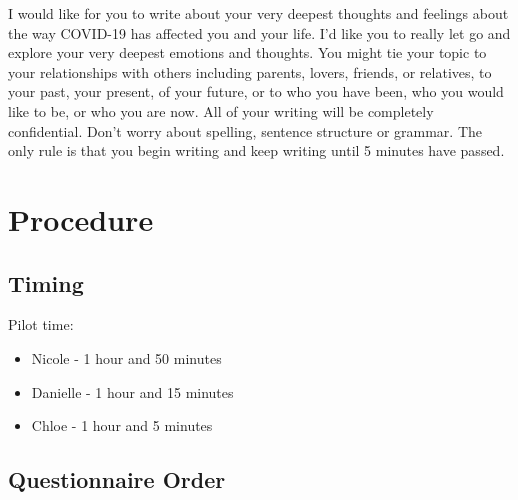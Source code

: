 \documentclass[]{book}
\providecommand{\tightlist}{%
  \setlength{\itemsep}{0pt}\setlength{\parskip}{0pt}}
\begin{document}
I would like for you to write about your very deepest thoughts and feelings about the way COVID-19 has affected you and your life. I'd like you to really let go and explore your very deepest emotions and thoughts. You might tie your topic to your relationships with others including parents, lovers, friends, or relatives, to your past, your present, of your future, or to who you have been, who you would like to be, or who you are now. All of your writing will be completely confidential. Don't worry about spelling, sentence structure or grammar. The only rule is that you begin writing and keep writing until 5 minutes have passed.

\hypertarget{procedure}{%
\section{Procedure}\label{procedure}}

\hypertarget{timing}{%
\subsection{Timing}\label{timing}}

Pilot time:

\begin{itemize}
\tightlist
\item
  Nicole - 1 hour and 50 minutes
\item
  Danielle - 1 hour and 15 minutes
\item
  Chloe - 1 hour and 5 minutes
\end{itemize}

\hypertarget{questionnaire-order}{%
\subsection{Questionnaire Order}\label{questionnaire-order}}
\end{document}
